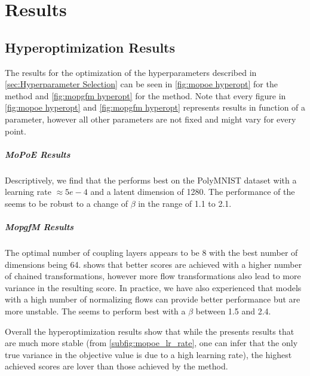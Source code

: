\chapter{Results}
\label{chap:results}




\section{Hyperoptimization Results}

The results for the optimization of the hyperparameters described in \cref{sec:Hyperparameter Selection} can be seen in \cref{fig:mopoe hyperopt} for the  method and \cref{fig:mopgfm hyperopt} for the  method.
Note that every figure in \cref{fig:mopoe hyperopt} and \cref{fig:mopgfm hyperopt} represents results in function of a parameter, however all other parameters are not fixed and might vary for every point.

\paragraph{MoPoE Results} Descriptively, we find that the  performs best on the PolyMNIST dataset with a learning rate $\approx 5e-4$ and a latent dimension of 1280.
The performance of the  seems to be robust to a change of $\beta$ in the range of 1.1 to 2.1.

\paragraph{MopgfM Results} The optimal number of coupling layers appears to be 8 with the best number of dimensions being 64.
 shows that better scores are achieved with a higher number of chained transformations, however more flow transformations also lead to more variance in the resulting score.
In practice, we have also experienced that models with a high number of normalizing flows can provide better performance but are more unstable.
The  seems to perform best with a $\beta$ between 1.5 and 2.4.

Overall the hyperoptimization results show that while the  presents results that are much more stable (from \cref{subfig:mopoe_lr_rate}, one can infer that the only true variance in the objective value is due to a high learning rate), the highest achieved scores are lover than those achieved by the  method.


